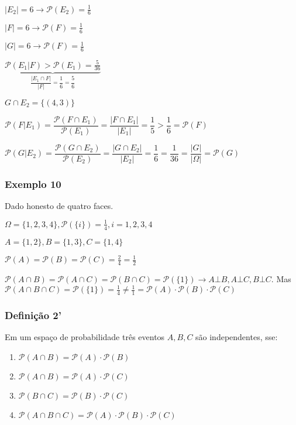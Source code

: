 \documentclass[a4paper]{article}
\begin{document}
	$|E_{2}|=6 \rightarrow \mathcal{P}(E_{2}) = \frac{1}{6}$
	
	$|F|=6 \rightarrow \mathcal{P}(F) = \frac{1}{6}$
	
	$|G|=6 \rightarrow \mathcal{P}(F) = \frac{1}{6}$
	
	$\underbrace{\mathcal{P}(E_{1}|F)>\mathcal{P}(E_{1})=\frac{5}{36}}_{\dfrac{|E_{1} \cap F|}{|F|} = \dfrac{1}{6} = \dfrac{5}{6}}$
	
	$G \cap E_{2} = \{(4,3)\}$
	
	$\mathcal{P}(F|E_{1})=\dfrac{\mathcal{P}(F \cap E_{1})}{\mathcal{P}(E_{1})} = \dfrac{|F \cap E_{1}|}{|E_{1}|} = \dfrac{1}{5} > \dfrac{1}{6} = \mathcal{P}(F)$
	
	$\mathcal{P}(G|E_{2})=\dfrac{\mathcal{P}(G \cap E_{2})}{\mathcal{P}(E_{2})} = \dfrac{|G \cap E_{2}|}{|E_{2}|} = \dfrac{1}{6} = \dfrac{1}{36} = \dfrac{|G|}{|\varOmega|} = \mathcal{P}(G)$
	
	\subsubsection{Exemplo 10}
	
	\noindent Dado honesto de quatro faces.
	
	$\varOmega = \{1,2,3,4\}, \mathcal{P}(\{i\}) = \frac{1}{4}, i=1,2,3,4$
	
	$A=\{1,2\}, B=\{1,3\}, C=\{1,4\}$
	
	$\mathcal{P}(A) = \mathcal{P}(B) = \mathcal{P}(C) = \frac{2}{4} = \frac{1}{2}$
	
	$\mathcal{P}(A \cap B)=\mathcal{P}(A \cap C)=\mathcal{P}(B \cap C)=\mathcal{P}(\{1\}) \rightarrow A \bot B, A \bot C, B \bot C$. Mas $\mathcal{P}(A \cap B \cap C) = \mathcal{P}(\{1\}) = \frac{1}{4} \neq \frac{1}{1} = \mathcal{P}(A) \cdot \mathcal{P}(B) \cdot \mathcal{P}(C)$
	
	\subsubsection{Definição 2'}
	
	Em um espaço de probabilidade três eventos $A, B, C$ são independentes, sse:
	
	\begin{enumerate}[label=(\roman*)]
		\item $\mathcal{P}(A \cap B) = \mathcal{P}(A) \cdot \mathcal{P}(B)$
		\item $\mathcal{P}(A \cap B) = \mathcal{P}(A) \cdot \mathcal{P}(C)$
		\item $\mathcal{P}(B \cap C) = \mathcal{P}(B) \cdot \mathcal{P}(C)$
		\item $\mathcal{P}(A \cap B \cap C) = \mathcal{P}(A) \cdot \mathcal{P}(B) \cdot \mathcal{P}(C)$
	\end{enumerate}
	
\end{document}
